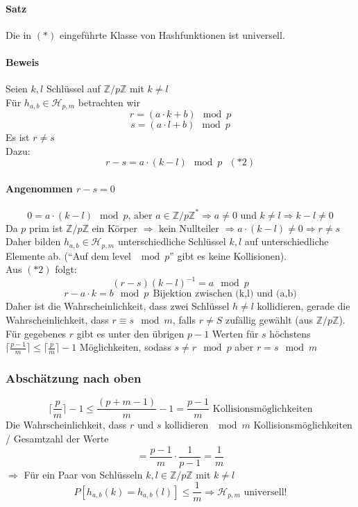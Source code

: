 \paragraph{Satz}
Die in $(*)$ eingeführte Klasse von Hashfunktionen ist universell.
\paragraph{Beweis}
Seien $k,l$ Schlüssel auf $\mathbb{Z}/p\mathbb{Z}$ mit $k\neq l$\\
Für $h_{a,b}\in \mathcal{H}_{p,m}$ betrachten wir
\[ r=(a\cdot k+b)\mod{p} \]
\[ s=(a\cdot l+b)\mod{p} \]
Es ist $r \neq s$\\
Dazu:
\[ r-s = a\cdot(k-l) \mod{p} ~~~(*2)\]
\paragraph{Angenommen $r-s=0$}
\[ 0=a\cdot(k-l)\mod{p}\text{, aber }a\in\mathbb{Z}/p\mathbb{Z}^* \Rightarrow a\neq 0\text{ und } k\neq l \Rightarrow k-l\neq 0 \]
Da $p$ prim ist $\mathbb{Z}/p\mathbb{Z}$ ein Körper $\Rightarrow$ kein Nullteiler $\Rightarrow a\cdot (k-l)\neq 0\Rightarrow r\neq s$\\
Daher bilden $h_{a,b}\in \mathcal{H}_{p,m}$ unterschiedliche Schlüssel $k,l$ auf unterschiedliche Elemente ab. ("`Auf dem level $\mod{p}$"' gibt es keine Kollisionen).\\
Aus $(*2)$ folgt:
\[ (r-s)(k-l)^{-1} = a\mod{p} \]
\[ r-a\cdot k = b\mod{p} ~~\text{Bijektion zwischen (k,l) und (a,b)}\]
Daher ist die Wahrscheinlichkeit, dass zwei Schlüssel $h\neq l$ kollidieren, gerade die Wahrscheinlichkeit, dass $r\equiv s \mod{m}$, falls $r\neq S$ zufällig gewählt (aus $\mathbb{Z}/p\mathbb{Z}$).\\
Für gegebenes $r$ gibt es unter den übrigen $p-1$ Werten für $s$ höchstens $\lceil \frac{p-1}{m} \rceil \leq \lceil \frac{p}{m} \rceil -1$ Möglichkeiten, sodass $s\neq r\mod{p}$ aber $r=s\mod{m}$
\subsubsection{Abschätzung nach oben}
\[\lceil \frac{p}{m} \rceil -1  \leq \frac{(p+m-1)}{m}-1 = \frac{p-1}{m} \text{ Kollisionsmöglichkeiten} \]
Die Wahrscheinlichkeit, dass $r$ und $s$ kollidieren $\mod{m}$ Kollisionsmöglichkeiten / Gesamtzahl der Werte
\[ =\frac{p-1}{m}\cdot\frac{1}{p-1}=\frac{1}{m} \]
$\Rightarrow$ Für ein Paar von Schlüsseln $k,l\in \mathbb{Z}/p\mathbb{Z}$ mit $k\neq l$
\[ P[h_{a,b}(k)=h_{a,b}(l)] \leq \frac{1}{m} \Rightarrow \mathcal{H}_{p,m} \text{ universell!} \]
